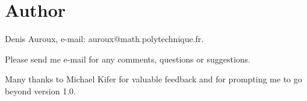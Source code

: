 \section{Author}
Denis Auroux, e-mail: auroux@math.polytechnique.fr. 

\noindent
Please send me e-mail for any comments, questions or suggestions. 

\noindent
Many thanks to Michael Kifer for valuable feedback and for prompting me
to go beyond version 1.0.




